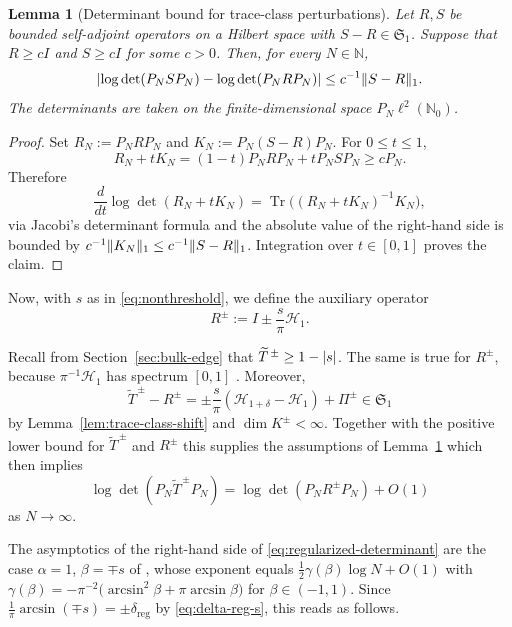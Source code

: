 \documentclass[11pt,a4paper,reqno]{amsart}
\newtheorem{lemma}[theorem]{Lemma}
\theoremstyle{remark}
\newcommand{\Nzero}{\mathbb N_0}
\newcommand{\Hh}{\mathcal H}
\newcommand{\Tr}{\operatorname{Tr}}
\newcommand{\id}{I}
\newcommand{\cS}{\mathfrak S_1}
\DeclarePairedDelimiter{\abs}{\lvert}{\rvert}
\DeclarePairedDelimiter{\norm}{\lVert}{\rVert}
\begin{document}
\begin{lemma}[Determinant bound for trace-class perturbations]\label{lem:stable-traceclass}
Let $R,S$ be bounded self-adjoint operators on a Hilbert space with $S-R\in\cS$. Suppose that
$R\ge c\id$ and $S\ge c\id$ for some $c>0$.  Then, for every $N\in\mathbb N$,
\begin{equation}\label{eq:stable-determinant}
 \abs*{\log\det(P_NSP_N)-\log\det(P_NRP_N)}
 \le c^{-1}\norm{S-R}_1.
\end{equation}
The determinants are taken on the finite-dimensional space $P_N\ell^2(\Nzero)$.
\end{lemma}

\begin{proof}
Set $R_N:=P_NRP_N$ and $K_N:=P_N(S-R)P_N$.  For $0\le t\le1$,
\[
 R_N+tK_N=(1-t)P_NRP_N+tP_NSP_N\ge cP_N.
\]
Therefore
\[
 \frac{d}{dt}\log\det(R_N+tK_N)
 =\Tr\bigl((R_N+tK_N)^{-1}K_N\bigr),
\]
via Jacobi's determinant formula
and the absolute value of the right-hand side is bounded by
$c^{-1}\norm{K_N}_1\le c^{-1}\norm{S-R}_1$.  Integration over $t\in[0,1]$
proves the claim.
\end{proof}

Now, with $s$ as in \eqref{eq:nonthreshold}, we define the auxiliary operator
\begin{equation}\label{eq:Rpm}
 R^\pm:=\id\pm\frac{s}{\pi}\Hh_1.
\end{equation}

Recall from Section~\ref{sec:bulk-edge} that
$\widetilde T^{\,\pm}\ge1-\abs{s}$. The same is true for $R^\pm$, because
$\pi^{-1}\Hh_1$ has spectrum $[0,1]$ \cite{Magnus}.  Moreover,
\begin{equation}\label{eq:regularized-difference}
 \widetilde T^{\,\pm}-R^\pm
 =\pm\frac{s}{\pi}(\Hh_{1+\delta}-\Hh_1)+\Pi^\pm
 \in\cS
\end{equation}
by Lemma~\ref{lem:trace-class-shift} and $\dim K^\pm < \infty$.
Together with the positive lower bound for $\widetilde T^{\,\pm}$ and
$R^\pm$ this supplies the assumptions of
Lemma~\ref{lem:stable-traceclass} which then implies
\begin{equation}\label{eq:regularized-determinant}
  \log\det(P_N\widetilde T^{\,\pm}P_N) = \log \det (P_N R^\pm P_N) + O(1)
\end{equation}
as $N\to\infty$.

The asymptotics of the right-hand side of
\eqref{eq:regularized-determinant} are the case $\alpha=1$, $\beta=\mp
s$ of \cite[Thm.~1.1]{Otte}, whose exponent equals
$\frac12\gamma(\beta)\log N+O(1)$ with
$\gamma(\beta)=-\pi^{-2}\bigl(\arcsin^2\beta+\pi\arcsin\beta\bigr)$
for $\beta\in(-1,1)$. Since $\frac1\pi\arcsin(\mp s)=\pm\delta_{\text{reg}}$
by \eqref{eq:delta-reg-s}, this reads as follows.
\end{document}

